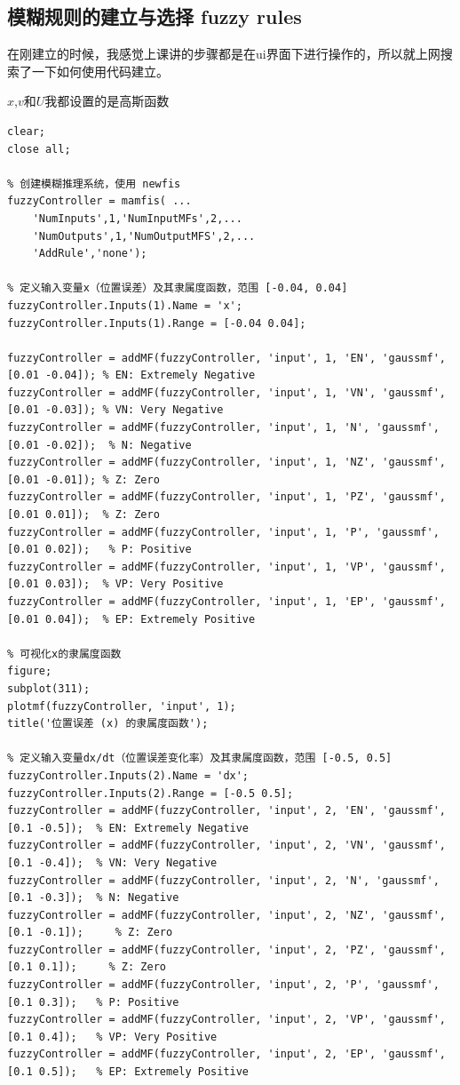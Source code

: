 \documentclass[12pt,a4paper,UTF8]{article}
\begin{document}
\subsection{模糊规则的建立与选择 fuzzy rules}

在刚建立的时候，我感觉上课讲的步骤都是在ui界面下进行操作的，所以就上网搜索了一下如何使用代码建立。

$x$,$v$和$U$我都设置的是高斯函数

\begin{lstlisting}
clear;
close all;

% 创建模糊推理系统，使用 newfis
fuzzyController = mamfis( ...
    'NumInputs',1,'NumInputMFs',2,...
    'NumOutputs',1,'NumOutputMFS',2,...
    'AddRule','none');

% 定义输入变量x（位置误差）及其隶属度函数，范围 [-0.04, 0.04]
fuzzyController.Inputs(1).Name = 'x';
fuzzyController.Inputs(1).Range = [-0.04 0.04];

fuzzyController = addMF(fuzzyController, 'input', 1, 'EN', 'gaussmf', [0.01 -0.04]); % EN: Extremely Negative
fuzzyController = addMF(fuzzyController, 'input', 1, 'VN', 'gaussmf', [0.01 -0.03]); % VN: Very Negative
fuzzyController = addMF(fuzzyController, 'input', 1, 'N', 'gaussmf', [0.01 -0.02]);  % N: Negative
fuzzyController = addMF(fuzzyController, 'input', 1, 'NZ', 'gaussmf', [0.01 -0.01]); % Z: Zero
fuzzyController = addMF(fuzzyController, 'input', 1, 'PZ', 'gaussmf', [0.01 0.01]);  % Z: Zero
fuzzyController = addMF(fuzzyController, 'input', 1, 'P', 'gaussmf', [0.01 0.02]);   % P: Positive
fuzzyController = addMF(fuzzyController, 'input', 1, 'VP', 'gaussmf', [0.01 0.03]);  % VP: Very Positive
fuzzyController = addMF(fuzzyController, 'input', 1, 'EP', 'gaussmf', [0.01 0.04]);  % EP: Extremely Positive

% 可视化x的隶属度函数
figure;
subplot(311);
plotmf(fuzzyController, 'input', 1);
title('位置误差 (x) 的隶属度函数');

% 定义输入变量dx/dt（位置误差变化率）及其隶属度函数，范围 [-0.5, 0.5]
fuzzyController.Inputs(2).Name = 'dx';
fuzzyController.Inputs(2).Range = [-0.5 0.5];
fuzzyController = addMF(fuzzyController, 'input', 2, 'EN', 'gaussmf', [0.1 -0.5]);  % EN: Extremely Negative
fuzzyController = addMF(fuzzyController, 'input', 2, 'VN', 'gaussmf', [0.1 -0.4]);  % VN: Very Negative
fuzzyController = addMF(fuzzyController, 'input', 2, 'N', 'gaussmf', [0.1 -0.3]);  % N: Negative
fuzzyController = addMF(fuzzyController, 'input', 2, 'NZ', 'gaussmf', [0.1 -0.1]);     % Z: Zero
fuzzyController = addMF(fuzzyController, 'input', 2, 'PZ', 'gaussmf', [0.1 0.1]);     % Z: Zero
fuzzyController = addMF(fuzzyController, 'input', 2, 'P', 'gaussmf', [0.1 0.3]);   % P: Positive
fuzzyController = addMF(fuzzyController, 'input', 2, 'VP', 'gaussmf', [0.1 0.4]);   % VP: Very Positive
fuzzyController = addMF(fuzzyController, 'input', 2, 'EP', 'gaussmf', [0.1 0.5]);   % EP: Extremely Positive


\end{lstlisting}
\end{document}
